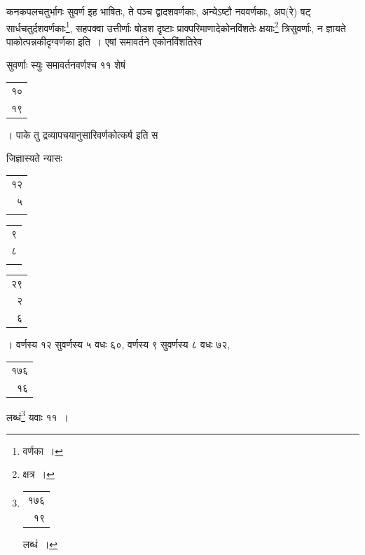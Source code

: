 \documentclass[10pt, openany]{book}
\begin{document}
{{{{कनकपलचतुर्भागः सुवर्ण इह भाषितः, ते पञ्च द्वादशवर्णकाः, अन्येऽष्टौ
नववर्णकाः,}
{अप(रे) षट् सार्धचतुर्दशवर्णकाः\renewcommand{\thefootnote}{\s १२}\footnote{\s *वर्णका~।}, सहपक्वा उत्तीर्णाः षोडश दृष्टाः
प्राक्परिमाणादेकोनविंशतेः}
{क्षयाः\renewcommand{\thefootnote}{\s १३}\footnote{\s क्षत्र~।}  त्रिसुवर्णाः, न ज्ञायते पाकोत्पन्नकीदृग्वर्णका इति~। एषां
समावर्तने एकोनविंशतिरेव}
{सुवर्णाः स्युः समावर्तनवर्णश्च ११ शेषं\begin{tabular}{r}१०\\१९\end{tabular}। पाके तु
द्रव्यापचयानुसारिवर्णकोत्कर्ष इति स}
{जिज्ञास्यते न्यासः\begin{tabular}{r|}१२\\५ \\ \\ \end{tabular}\begin{tabular}{r|} ९\\८ \\ \\ \end{tabular}\begin{tabular}{r}२९ \\ २\\ ६\end{tabular}। वर्णस्य १२ सुवर्णस्य ५ वधः ६०, वर्णस्य
९ सुवर्णस्य ८ वधः ७२,}

\newpage

\begin{tabular}{r}१७६ \\ १६\end{tabular}{लब्धं\renewcommand{\thefootnote}{\s १}\footnote{\s \begin{tabular}{r}१७६\\१९\end{tabular}लब्धं~।} यवाः ११~।}

}}}
\end{document}
